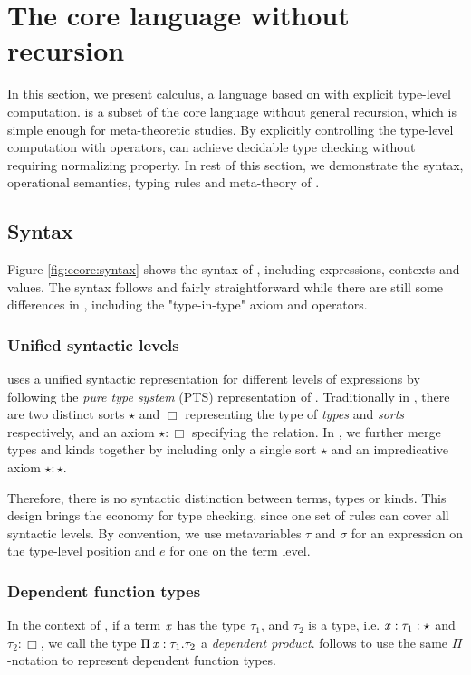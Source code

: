 \section{The core language without recursion}\label{sec:ecore}

In this section, we present \ecore calculus, a language based on \cc with explicit type-level computation. \ecore is a subset of the core language \name without general recursion, which is simple enough for meta-theoretic studies. By explicitly controlling the type-level computation with \cast operators, \ecore can achieve decidable type checking without requiring normalizing property. In rest of this section, we demonstrate the syntax, operational semantics, typing rules and meta-theory of \ecore.

\subsection{Syntax}\label{sec:ecore:syn}
Figure \ref{fig:ecore:syntax} shows the syntax of \ecore, including expressions, contexts and values. The syntax follows \cc and fairly straightforward while there are still some differences in \ecore, including the "type-in-type" axiom and \cast operators.

\subsubsection{Unified syntactic levels}
\ecore uses a unified syntactic representation for different levels of expressions by following the \emph{pure type system} (PTS) representation of \cc. Traditionally in \cc, there are two distinct sorts $\star$ and $\Box$ representing the type of \emph{types} and \emph{sorts} respectively, and an axiom $\star:\Box$ specifying the relation. In \ecore, we further merge types and kinds together by including only a single sort $\star$ and an impredicative axiom $\star:\star$. 

Therefore, there is no syntactic distinction between terms, types or kinds. This design brings the economy for type checking, since one set of rules can cover all syntactic levels. By convention, we use metavariables $\tau$ and $\sigma$ for an expression on the type-level position and $e$ for one on the term level.

\subsubsection{Dependent function types}
In the context of \cc, if a term $\mathit{x}$ has the type $\tau_{{\mathrm{1}}}$, and $\tau_{{\mathrm{2}}}$ is a type, i.e. $\mathit{x}:\tau_{{\mathrm{1}}}:\star$ and $\tau_{{\mathrm{2}}}:\Box$, we call the type $\Pi \, \mathit{x}  :  \tau_{{\mathrm{1}}}  .  \tau_{{\mathrm{2}}}$ a \emph{dependent product}. \ecore follows \cc to use the same $ \Pi $-notation to represent dependent function types.

